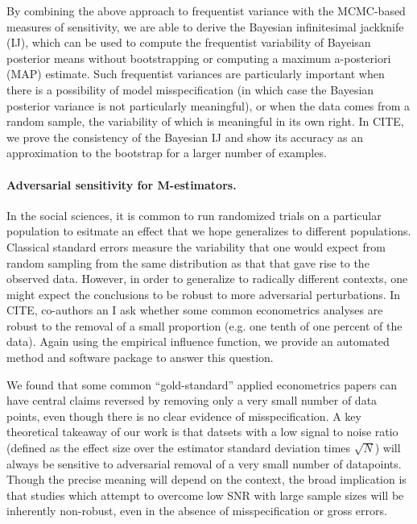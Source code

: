 By combining the above approach to frequentist variance with the MCMC-based
measures of sensitivity, we are able to derive the Bayesian infinitesimal
jackknife (IJ), which can be used to compute the frequentist variability
of Bayeisan posterior means without bootstrapping or computing a maximum
a-posteriori (MAP) estimate.  Such frequentist variances are particularly
important when there is a possibility of model misspecification (in which
case the Bayesian posterior variance is not particularly meaningful),
or when the data comes from a random sample, the variability of which
is meaningful in its own right.  In CITE, we prove the consistency
of the Bayesian IJ and show its accuracy as an approximation to the bootstrap
for a larger number of examples.


\paragraph{Adversarial sensitivity for M-estimators.}

In the social sciences, it is common to run randomized trials on a particular
population to esitmate an effect that we hope generalizes to different
populations.  Classical standard errors measure the variability that one
would expect from random sampling from the same distribution as that that
gave rise to the observed data.  However, in order to generalize to radically
different contexts, one might expect the conclusions to be robust to more
adversarial perturbations.  In CITE, co-authors an I ask whether some
common econometrics analyses are robust to the removal of a small proportion
(e.g. one tenth of one percent of the data).  Again using the empirical
influence function, we provide an automated method and software package
to answer this question.

We found that some common ``gold-standard'' applied econometrics papers
can have central claims reversed by removing only a very small number of
data points, even though there is no clear evidence of misspecification.
A key theoretical takeaway of our work is that datsets with a low signal
to noise ratio (defined as the effect size over the estimator standard
deviation times $\sqrt{N}$) will always be sensitive to adversarial removal
of a very small number of datapoints.  Though the precise meaning will
depend on the context, the broad implication is that studies which
attempt to overcome low SNR with large sample sizes will be inherently
non-robust, even in the absence of misspecification or gross errors.


